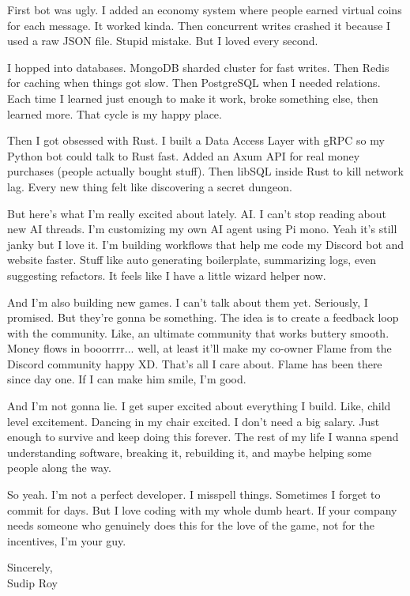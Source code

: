 \documentclass[10pt,a4paper]{article}
\begin{document}
First bot was ugly. I added an economy system where people earned virtual coins for each message. It worked kinda. Then concurrent writes crashed it because I used a raw JSON file. Stupid mistake. But I loved every second.

I hopped into databases. MongoDB sharded cluster for fast writes. Then Redis for caching when things got slow. Then PostgreSQL when I needed relations. Each time I learned just enough to make it work, broke something else, then learned more. That cycle is my happy place.

Then I got obsessed with Rust. I built a Data Access Layer with gRPC so my Python bot could talk to Rust fast. Added an Axum API for real money purchases (people actually bought stuff). Then libSQL inside Rust to kill network lag. Every new thing felt like discovering a secret dungeon.

But here's what I'm really excited about lately. AI. I can't stop reading about new AI threads. I'm customizing my own AI agent using Pi mono. Yeah it's still janky but I love it. I'm building workflows that help me code my Discord bot and website faster. Stuff like auto generating boilerplate, summarizing logs, even suggesting refactors. It feels like I have a little wizard helper now.

And I'm also building new games. I can't talk about them yet. Seriously, I promised. But they're gonna be something. The idea is to create a feedback loop with the community. Like, an ultimate community that works buttery smooth. Money flows in booorrrr... well, at least it'll make my co-owner Flame from the Discord community happy XD. That's all I care about. Flame has been there since day one. If I can make him smile, I'm good.

And I'm not gonna lie. I get super excited about everything I build. Like, child level excitement. Dancing in my chair excited. I don't need a big salary. Just enough to survive and keep doing this forever. The rest of my life I wanna spend understanding software, breaking it, rebuilding it, and maybe helping some people along the way.

So yeah. I'm not a perfect developer. I misspell things. Sometimes I forget to commit for days. But I love coding with my whole dumb heart. If your company needs someone who genuinely does this for the love of the game, not for the incentives, I'm your guy.

\vspace{0.8em}

\noindent Sincerely,\\
Sudip Roy
\end{document}
